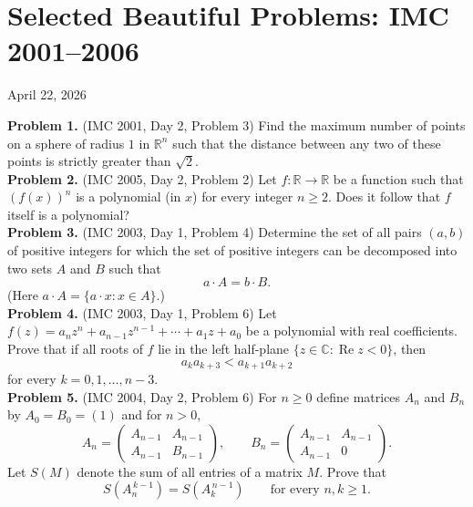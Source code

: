 \documentclass{article}
\begin{document}
\pagestyle{plain}

\section*{Selected Beautiful Problems: IMC 2001--2006}

\begin{center}
April 22, 2026
\end{center}

\textbf{Problem 1.} (IMC 2001, Day 2, Problem 3)
Find the maximum number of points on a sphere of radius \( 1 \) in \( \mathbb{R}^n \) such that the distance between any two of these points is strictly greater than \( \sqrt{2} \).
\\

\textbf{Problem 2.} (IMC 2005, Day 2, Problem 2)
Let \( f : \mathbb{R} \to \mathbb{R} \) be a function such that \( (f(x))^n \) is a polynomial (in \( x \)) for every integer \( n \geq 2 \). Does it follow that \( f \) itself is a polynomial?
\\

\textbf{Problem 3.} (IMC 2003, Day 1, Problem 4)
Determine the set of all pairs \( (a, b) \) of positive integers for which the set of positive integers can be decomposed into two sets \( A \) and \( B \) such that
\[
a \cdot A = b \cdot B.
\]
(Here \( a \cdot A = \{ a \cdot x : x \in A \} \).)
\\

\textbf{Problem 4.} (IMC 2003, Day 1, Problem 6)
Let \( f(z) = a_n z^n + a_{n-1} z^{n-1} + \cdots + a_1 z + a_0 \) be a polynomial with real coefficients. Prove that if all roots of \( f \) lie in the left half-plane \( \{ z \in \mathbb{C} : \operatorname{Re} z < 0 \} \), then
\[
a_k a_{k+3} < a_{k+1} a_{k+2}
\]
for every \( k = 0, 1, \ldots, n-3 \).
\\

\textbf{Problem 5.} (IMC 2004, Day 2, Problem 6)
For \( n \geq 0 \) define matrices \( A_n \) and \( B_n \) by \( A_0 = B_0 = (1) \) and for \( n > 0 \),
\[
A_n = \begin{pmatrix} A_{n-1} & A_{n-1} \\ A_{n-1} & B_{n-1} \end{pmatrix}, \qquad
B_n = \begin{pmatrix} A_{n-1} & A_{n-1} \\ A_{n-1} & 0 \end{pmatrix}.
\]
Let \( S(M) \) denote the sum of all entries of a matrix \( M \). Prove that
\[
S(A_n^{\,k-1}) = S(A_k^{\,n-1}) \qquad \text{for every } n, k \geq 1.
\]
\\
\end{document}
